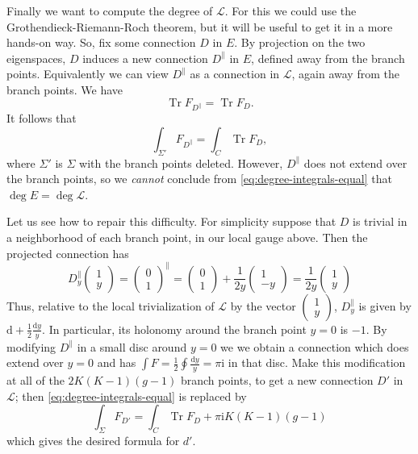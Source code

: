 \documentclass[12pt,letterpaper,reqno]{article}
\numberwithin{equation}{section}
\newcommand{\cL}{\ensuremath{\mathcal L}}
\newcommand{\half}{\ensuremath{\frac{1}{2}}}
\newcommand{\I}{{\mathrm i}}
\newcommand{\de}{\mathrm{d}}
\newcommand{\ti}[1]{\textit{#1}}
\DeclareMathOperator{\Tr}{Tr}
\begin{document}
\begin{pf}
Finally we want to compute the degree of $\cL$.
For this we could use the Grothendieck-Riemann-Roch theorem,
but it will be useful to get it in a more hands-on way.
So, fix some connection $D$ in $E$.
By projection on the two eigenspaces, $D$ induces a new
connection $D^\parallel$ in $E$, defined away from the branch points.
Equivalently we can view $D^\parallel$ as a connection in $\cL$,
again away from the branch points. We have
\begin{equation}
   \Tr F_{D^\parallel} = \Tr F_D.
\end{equation}
It follows that
\begin{equation} \label{eq:degree-integrals-equal}
  \int_{\Sigma'} F_{D^\parallel} = \int_C \Tr F_D,
\end{equation}
where $\Sigma'$ is $\Sigma$ with the branch points deleted.
However, $D^\parallel$ does not extend
over the branch points, so we \ti{cannot} conclude
from \eqref{eq:degree-integrals-equal} that
$\deg E = \deg \cL$.

Let us see how to repair this difficulty.
For simplicity suppose that
$D$ is trivial in a neighborhood of each branch point,
in our local gauge above. Then the projected connection
has
\begin{equation}
 D^\parallel_y \begin{pmatrix} 1 \\ y \end{pmatrix} = \begin{pmatrix} 0 \\ 1 \end{pmatrix}^\parallel = \begin{pmatrix} 0 \\ 1 \end{pmatrix} + \frac{1}{2y} \begin{pmatrix} 1 \\ -y \end{pmatrix} = \frac{1}{2y} \begin{pmatrix} 1 \\ y \end{pmatrix}
\end{equation}
Thus, relative to the local trivialization of $\cL$ by the
vector $\begin{pmatrix} 1 \\ y \end{pmatrix}$, $D_y^\parallel$
is given by $\de + \frac{1}{2} \frac{\de y}{y}$.
In particular, its holonomy around the branch point $y=0$
is $-1$.
By modifying $D^\parallel$ in a small disc around $y=0$
we we obtain a connection which does extend over $y = 0$
and has $\int F = \half \oint \frac{\de y}{y} = \pi \I$ in that disc.
Make this modification at all of the $2K(K-1)(g-1)$ branch points,
to get a new connection $D'$ in $\cL$;
then \eqref{eq:degree-integrals-equal} is replaced by
\begin{equation}
\int_{\Sigma} F_{D'} = \int_C \Tr F_D + \pi \I K(K-1)(g-1)
\end{equation}
which gives the desired formula for $d'$.


\end{pf}
\end{document}
